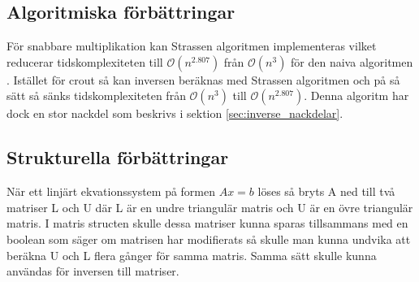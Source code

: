\subsection{Algoritmiska förbättringar}
För snabbare multiplikation kan Strassen algoritmen implementeras vilket reducerar tidskomplexiteten till $\mathcal{O}(n^{2.807})$ från $\mathcal{O}(n^3)$ för den naiva algoritmen \citep{Strassen1969}. Istället för crout så kan inversen beräknas med Strassen algoritmen och på så sätt så sänks tidskomplexiteten från $\mathcal{O}(n^3)$ till $\mathcal{O}(n^{2.807})$. Denna algoritm har dock en stor nackdel som beskrivs i sektion \ref{sec:inverse_nackdelar}.

\subsection{Strukturella förbättringar}
När ett linjärt ekvationssystem på formen $Ax=b $ löses så bryts A ned till två matriser L och U där L är en undre triangulär matris och U är en övre triangulär matris\citep{Ching}. I matris structen skulle dessa matriser kunna sparas tillsammans med en boolean som säger om matrisen har modifierats så skulle man kunna undvika att beräkna U och L flera gånger för samma matris. Samma sätt skulle kunna användas för inversen till matriser. 

